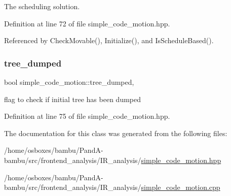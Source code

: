 The scheduling solution. 



Definition at line 72 of file simple\+\_\+code\+\_\+motion.\+hpp.



Referenced by Check\+Movable(), Initialize(), and Is\+Schedule\+Based().

\mbox{\label{classsimple__code__motion_a592659ec32a51bfc395647f04ae2b027}} 
\subsubsection{\texorpdfstring{tree\+\_\+dumped}{tree\_dumped}}
{\footnotesize\ttfamily bool simple\+\_\+code\+\_\+motion\+::tree\+\_\+dumped\hspace{0.3cm}{\ttfamily [static]}, {\ttfamily [private]}}



flag to check if initial tree has been dumped 



Definition at line 75 of file simple\+\_\+code\+\_\+motion.\+hpp.



The documentation for this class was generated from the following files\+:\begin{DoxyCompactItemize}
\item 
/home/osboxes/bambu/\+Pand\+A-\/bambu/src/frontend\+\_\+analysis/\+I\+R\+\_\+analysis/\hyperlink{simple__code__motion_8hpp}{simple\+\_\+code\+\_\+motion.\+hpp}\item 
/home/osboxes/bambu/\+Pand\+A-\/bambu/src/frontend\+\_\+analysis/\+I\+R\+\_\+analysis/\hyperlink{simple__code__motion_8cpp}{simple\+\_\+code\+\_\+motion.\+cpp}\end{DoxyCompactItemize}
